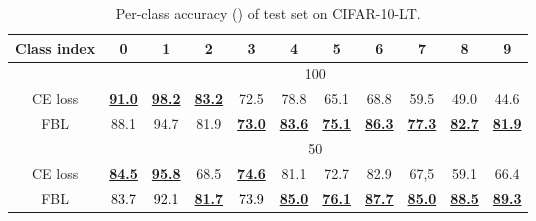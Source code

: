 \documentclass{article}
\begin{document}
\begin{table}[t]
 \begin{minipage}[t]{0.5\textwidth}
 \centering  \caption{Per-class accuracy () of test set on CIFAR-10-LT.}
	\label{tab:per-class-acc-10}
    \setlength{\tabcolsep}{8pt}
\resizebox{0.95\textwidth}{!}
	{
	\begin{tabular}{c |c c c c c c c c c c}
		\toprule[0.8pt]
		Class index & 0 & 1 & 2& 3& 4& 5& 6& 7& 8& 9 \\
		\hline
        \hline
		 & \multicolumn{10}{c}{100} \\
        \hline		
		CE loss & \underline{\textbf{91.0}}& \underline{\textbf{98.2}}& \underline{\textbf{83.2}}& 72.5& 78.8& 65.1& 68.8& 59.5& 49.0& 44.6\\
		FBL & 88.1& 94.7& 81.9& \underline{\textbf{73.0}}& \underline{\textbf{83.6}}& \underline{\textbf{75.1}}& \underline{\textbf{86.3}}& \underline{\textbf{77.3}}& \underline{\textbf{82.7}}& \underline{\textbf{81.9}}\\
		\hline
		 & \multicolumn{10}{c}{50} \\
        \hline		
		CE loss & \underline{\textbf{84.5}}& \underline{\textbf{95.8}}& 68.5& \underline{\textbf{74.6}}& 81.1& 72.7& 82.9& 67,5& 59.1& 66.4 \\
		FBL & \textcolor{black}{83.7}& \textcolor{black}{92.1}& \underline{\textbf{81.7}}& \textcolor{black}{73.9}& \underline{\textbf{85.0}}& \underline{\textbf{76.1}}& \underline{\textbf{87.7}}& \underline{\textbf{85.0}}& \underline{\textbf{88.5}}& \underline{\textbf{89.3}}\\
		\bottomrule[0.8pt]
	\end{tabular}
	}
 \end{minipage}


\end{table}
\end{document}
